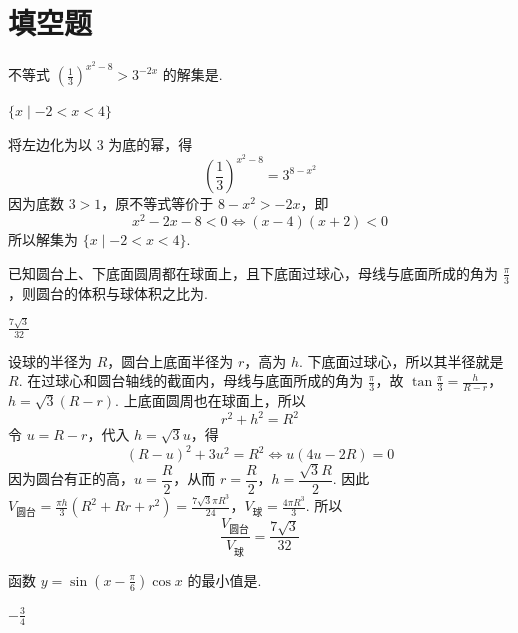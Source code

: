 \section{填空题}

\begin{problem}
不等式 \(\left(\frac{1}{3}\right)^{x^{2} - 8} > 3^{-2x}\) 的解集是\fillinblank{}.
\end{problem}

\begin{answer}
\(\{x\mid -2 < x < 4\}\)
\end{answer}

\begin{solution}
将左边化为以 \(3\) 为底的幂，得
\[
\left(\frac13\right)^{x^2-8}=3^{8-x^2}
\]
因为底数 \(3>1\)，原不等式等价于 \(8-x^2>-2x\)，即
\[
x^2-2x-8<0\Longleftrightarrow (x-4)(x+2)<0
\]
所以解集为 \(\{x\mid -2<x<4\}\).
\end{solution}

\begin{problem}
已知圆台上、下底面圆周都在球面上，且下底面过球心，母线与底面所成的角为 \(\frac{\pi}{3}\)，则圆台的体积与球体积之比为\fillinblank{}.
\end{problem}

\begin{answer}
\(\frac{7\sqrt{3}}{32}\)
\end{answer}

\begin{solution}
设球的半径为 \(R\)，圆台上底面半径为 \(r\)，高为 \(h\). 下底面过球心，所以其半径就是 \(R\). 在过球心和圆台轴线的截面内，母线与底面所成的角为 \(\frac{\pi}{3}\)，故
\(\tan\frac{\pi}{3}=\frac{h}{R-r}\)，\(h=\sqrt3(R-r)\).
上底面圆周也在球面上，所以
\[
r^2+h^2=R^2
\]
令 \(u=R-r\)，代入 \(h=\sqrt3u\)，得
\[
(R-u)^2+3u^2=R^2\Longleftrightarrow u(4u-2R)=0
\]
因为圆台有正的高，\(u=\dfrac R2\)，从而 \(r=\dfrac R2\)，\(h=\dfrac{\sqrt3 R}{2}\). 因此
\(V_{\text{圆台}}=\frac{\pi h}{3}\left(R^2+Rr+r^2\right) =\frac{7\sqrt3\pi R^3}{24}\)，\(V_{\text{球}}=\frac{4\pi R^3}{3}\).
所以
\[
\frac{V_{\text{圆台}}}{V_{\text{球}}}
=\frac{7\sqrt3}{32}
\]
\end{solution}

\begin{problem}
函数 \(y = \sin \left(x - \frac{\pi}{6} \right) \cos x \) 的最小值是\fillinblank{}.
\end{problem}

\begin{answer}
\(-\frac{3}{4}\)
\end{answer}

